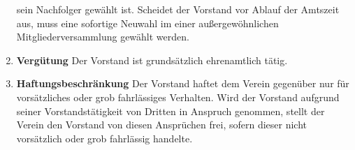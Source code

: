 \documentclass{scrartcl}
\begin{document}
\begin{enumerate}
                sein Nachfolger gewählt ist. 
                Scheidet der Vorstand vor Ablauf der Amtszeit aus, muss eine sofortige Neuwahl im einer außergewöhnlichen Mitgliederversammlung gewählt werden.
            \item \textbf{Vergütung} \newline
                Der Vorstand ist grundsätzlich ehrenamtlich tätig.
            \item \textbf{Haftungsbeschränkung} \newline    
                Der Vorstand haftet dem Verein gegenüber nur für vorsätzliches oder grob
                fahrlässiges Verhalten. Wird der Vorstand aufgrund seiner Vorstandstätigkeit von
                Dritten in Anspruch genommen, stellt der Verein den Vorstand von
                diesen Ansprüchen frei, sofern dieser nicht vorsätzlich oder grob fahrlässig
                handelte.
        \end{enumerate}
\end{document}
